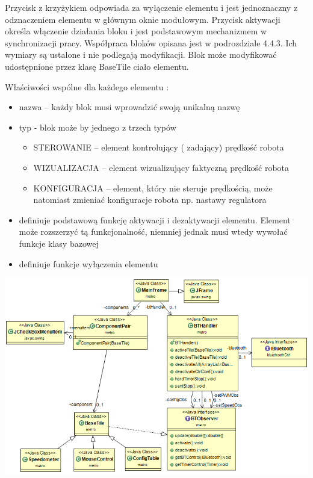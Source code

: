 \documentclass[eng,printmode]{mgr}
\begin{document}
Przycisk z krzyżykiem odpowiada za wyłączenie elementu i jest jednoznaczny z odznaczeniem elementu w głównym oknie modułowym. Przycisk aktywacji określa włączenie działania bloku i jest podstawowym mechanizmem w synchronizacji pracy. Współpraca bloków opisana jest w podrozdziale 4.4.3. Ich wymiary  są ustalone i nie podlegają modyfikacji. Blok może modyfikować udostępnione przez klasę BaseTile ciało elementu.

Właściwości wspólne dla każdego elementu :
\begin{itemize}
  \item nazwa – każdy blok musi wprowadzić swoją unikalną nazwę
  \item typ  - blok może by jednego z trzech typów
  \begin{itemize}
    \item STEROWANIE – element kontrolujący ( zadający) prędkość robota
    \item WIZUALIZACJA – element wizualizujący faktyczną prędkość robota
    \item KONFIGURACJA – element, który nie steruje prędkością, może natomiast zmieniać konfiguracje robota np. nastawy regulatora
  \end{itemize}
  \item definiuje podstawową funkcję aktywacji i dezaktywacji elementu. Element może rozszerzyć tą funkcjonalność, niemniej jednak musi wtedy wywołać funkcje klasy bazowej
  \item definiuje funkcje wyłączenia elementu
\end{itemize}

\begin{center}
  \includegraphics{images/metro}
\end{center}
\end{document}
